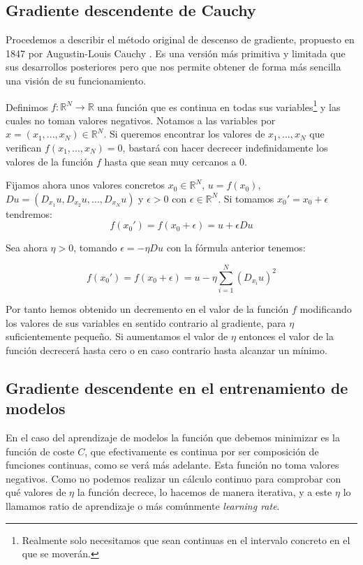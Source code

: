 \subsection{Gradiente descendente de Cauchy}

Procedemos a describir el método original de descenso de gradiente, propuesto en 1847 por Augustin-Louis Cauchy \cite{CauchyGD}. Es una versión más primitiva y limitada que sus desarrollos posteriores pero que nos permite obtener de forma más sencilla una visión de su funcionamiento. 

Definimos $f:\mathbb{R}^N \rightarrow \mathbb{R}$ una función que es continua en todas sus variables\footnote{Realmente solo necesitamos que sean continuas en el intervalo concreto en el que se moverán.} y las cuales no toman valores negativos. Notamos a las variables por $x= \left ( x_1,...,x_N \right ) \in \mathbb{R}^N$. Si queremos encontrar los valores de $x_1,...,x_N$ que verifican $f(x_1,...,x_N)=0$, bastará con hacer decrecer indefinidamente los valores de la función $f$ hasta que sean muy cercanos a $0$. 

Fijamos ahora unos valores concretos $x_0 \in \mathbb{R}^N$, $u=f(x_0)$, $Du= \left ( D_{x_1}u, D_{x_2}u, ..., D_{x_N}u \right )$ y $\epsilon >0$ con $\epsilon \in \mathbb{R}^N$. Si tomamos $x_0'=x_0+\epsilon$ tendremos:
$$f(x_0')= f(x_0 + \epsilon) = u + \epsilon Du$$

Sea ahora $\eta >0$, tomando $\epsilon= - \eta Du$ con la fórmula anterior tenemos: 

$$f(x_0') = f(x_0 + \epsilon) = u - \eta \sum_{i=1}^{N}(D_{x_i}u)^2$$

Por tanto hemos obtenido un decremento en el valor de la función $f$ modificando los valores de sus variables en sentido contrario al gradiente, para $\eta$ suficientemente pequeño. Si aumentamos el valor de $\eta$ entonces el valor de la función decrecerá hasta cero o en caso contrario hasta alcanzar un mínimo. 




\subsection{Gradiente descendente en el entrenamiento de modelos}

En el caso del aprendizaje de modelos la función que debemos minimizar es la función de coste $C$, que efectivamente es continua por ser composición de funciones continuas, como se verá más adelante. Esta función no toma valores negativos. Como no podemos realizar un cálculo continuo para comprobar con qué valores de $\eta$ la función decrece, lo hacemos de manera iterativa, y a este $\eta$ lo llamamos ratio de aprendizaje o más comúnmente \textit{learning rate}. 

